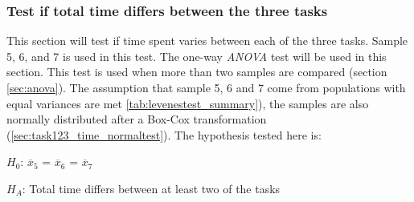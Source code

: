 \subsubsection[Sample 5, 6 and 7]{Test if total time differs between the three tasks}\label{sec:anova_result} %
This section will test if time spent varies between each of the three tasks. Sample 5, 6, and 7 is used in this test. The one-way \textit{ANOVA} test will be used in this section. This test is used when more than two samples are compared (section \ref{sec:anova}). The assumption that sample 5, 6 and 7 come from populations with equal variances are met \ref{tab:levenestest_summary}), the samples are also normally distributed after a Box-Cox transformation (\ref{sec:task123_time_normaltest}). The hypothesis tested here is:\\

\centerline{$H_{0}$: $\overline{x}_5$ = $\overline{x}_6$ = $\overline{x}_7$}
\centerline{$H_{A}$: Total time differs between at least two of the tasks}


